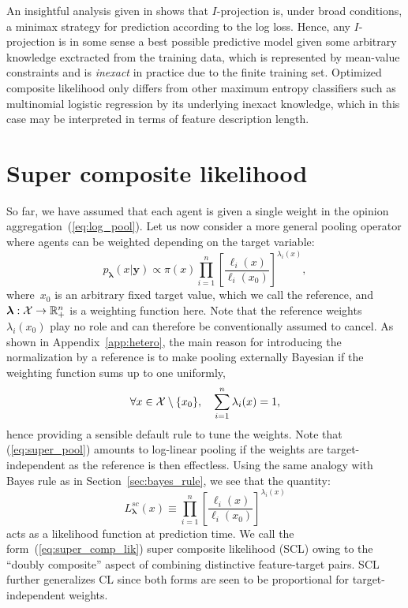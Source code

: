 \documentclass[english]{scrartcl}
\def\y{{\mathbf{y}}}
\newcommand{\blambda}{{\boldsymbol{\lambda}}}
\begin{document}
An insightful analysis given in \cite{Grunwald-04} shows that $I$-projection is, under broad conditions, a minimax strategy for prediction according to the log loss. Hence, any $I$-projection is in some sense a best possible predictive model given some arbitrary knowledge exctracted from the training data, which is represented by mean-value constraints and is {\em inexact} in practice due to the finite training set. Optimized composite likelihood only differs from other maximum entropy classifiers such as multinomial logistic regression by its underlying inexact knowledge, which in this case may be interpreted in terms of feature description length.


\section{Super composite likelihood}
\label{sec:super}

So far, we have assumed that each agent is given a single weight in the opinion aggregation~(\ref{eq:log_pool}). Let us now consider a more general pooling operator where agents can be weighted depending on the target variable:
\begin{equation}
\label{eq:super_pool}
p_\blambda(x|\y) \propto \pi(x) \prod_{i=1}^n \left[\frac{\ell_i(x)}{\ell_i(x_0)}\right]^{\lambda_i(x)},    
\end{equation}
where~$x_0$ is an arbitrary fixed target value, which we call the reference, and $\blambda: {\cal X}\to \mathbb{R}_+^n$ is a weighting function here. Note that the reference weights $\lambda_i(x_0)$ play no role and can therefore be conventionally assumed to cancel. As shown in Appendix~\ref{app:hetero}, the main reason for introducing the normalization by a reference is to make pooling externally Bayesian if the weighting function sums up to one uniformly,
$$
\forall x\in{\cal X}\setminus \{x_0\},\quad
\sum_{i=1}^n \lambda_i(x) = 1,
$$
hence providing a sensible default rule to tune the weights. Note that (\ref{eq:super_pool}) amounts to log-linear pooling if the weights are target-independent as the reference is then effectless. Using the same analogy with Bayes rule as in Section~\ref{sec:bayes_rule}, we see that the quantity:
\begin{equation}
\label{eq:super_comp_lik}
L^{sc}_\blambda(x) \equiv 
\prod_{i=1}^n \left[\frac{\ell_i(x)}{\ell_i(x_0)}\right]^{\lambda_i(x)}
\end{equation} 
acts as a likelihood function at prediction time. We call the form~(\ref{eq:super_comp_lik}) super composite likelihood (SCL) owing to the ``doubly composite'' aspect of combining distinctive feature-target pairs. SCL further generalizes CL since both forms are seen to be proportional for target-independent weights. 
\end{document}
